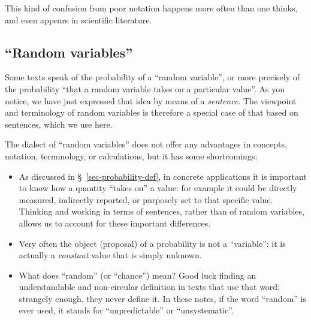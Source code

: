 \documentclass[
  a4paper,
  DIV=11,
  numbers=noendperiod,
  oneside]{scrreprt}
\begin{document}

This kind of confusion from poor notation happens more often than one
thinks, and even appears in scientific literature.

\hypertarget{random-variables}{%
\subsection{``Random variables''}\label{random-variables}}

Some texts speak of the probability of a ``random variable'', or more
precisely of the probability ``that a random variable takes on a
particular value''. As you notice, we have just expressed that idea by
means of a \emph{sentence}. The viewpoint and terminology of random
variables is therefore a special case of that based on sentences, which
we use here.

The dialect of ``random variables'' does not offer any advantages in
concepts, notation, terminology, or calculations, but it has some
shortcomings:

\begin{itemize}
\item
  As discussed in §~\ref{sec-probability-def}, in concrete applications
  it is important to know how a quantity ``takes on'' a value: for
  example it could be directly measured, indirectly reported, or
  purposely set to that specific value. Thinking and working in terms of
  sentences, rather than of random variables, allows us to account for
  these important differences.
\item
  Very often the object (proposal) of a probability is not a
  ``variable'': it is actually a \emph{constant} value that is simply
  unknown.
\item
  What does ``random'' (or ``chance'') mean? Good luck finding an
  understandable and non-circular definition in texts that use that
  word; strangely enough, they never define it. In these notes, if the
  word ``random'' is ever used, it stands for ``unpredictable'' or
  ``unsystematic''.
\end{itemize}
\end{document}
